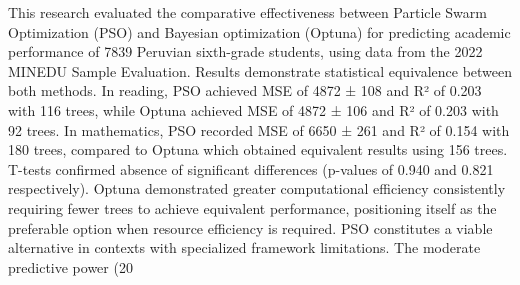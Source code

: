 \documentclass[conference]{IEEEtran}
\begin{document}
This research evaluated the comparative effectiveness between Particle Swarm Optimization (PSO) and Bayesian optimization (Optuna) for predicting academic performance of 7839 Peruvian sixth-grade students, using data from the 2022 MINEDU Sample Evaluation. Results demonstrate statistical equivalence between both methods. In reading, PSO achieved MSE of 4872 ± 108 and R² of 0.203 with 116 trees, while Optuna achieved MSE of 4872 ± 106 and R² of 0.203 with 92 trees. In mathematics, PSO recorded MSE of 6650 ± 261 and R² of 0.154 with 180 trees, compared to Optuna which obtained equivalent results using 156 trees. T-tests confirmed absence of significant differences (p-values of 0.940 and 0.821 respectively). Optuna demonstrated greater computational efficiency consistently requiring fewer trees to achieve equivalent performance, positioning itself as the preferable option when resource efficiency is required. PSO constitutes a viable alternative in contexts with specialized framework limitations. The moderate predictive power (20%
\end{document}
